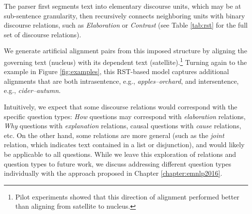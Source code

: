 The parser first segments text into elementary discourse units, which may be at sub-sentence granularity, then recursively connects neighboring units with binary discourse relations, such as \emph{Elaboration} or \emph{Contrast} (see Table \ref{tab:rst} for the full set of discourse relations).

We generate artificial alignment pairs from this imposed structure by aligning the governing text (nucleus) with its dependent text (satellite).\footnote{Pilot experiments showed that this direction of alignment performed better than aligning from satellite to nucleus.} 
 Turning again to the example in Figure \ref{fig:examples}, this RST-based model captures additional alignments that are both intrasentence, e.g., \emph{apples--orchard}, and intersentence, e.g., {\em cider--autumn}. 

Intuitively, we expect that some discourse relations would correspond with the specific question types: \textit{How} questions may correspond with \textit{elaboration} relations, \textit{Why} questions with \textit{explanation} relations, causal questions with \textit{cause} relations, etc.  On the other hand, some relations are more general (such as the \textit{joint} relation, which indicates text contained in a list or disjunction), and would likely be applicable to all questions.  While we leave this exploration of relations and question types to future work, we discuss addressing different question types individually with the approach proposed in Chapter \ref{chapter:emnlp2016}. 
